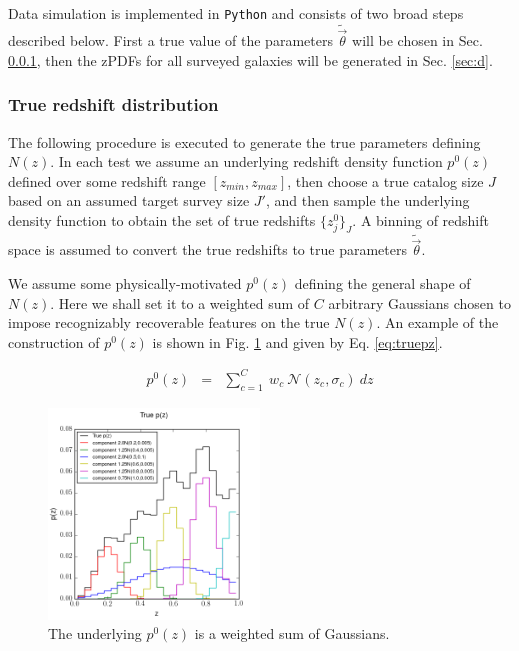 \documentclass[preprint]{aastex}
\begin{document}
Data simulation is implemented in \texttt{Python} and consists of two broad 
steps described below.  First a true value of the parameters 
$\tilde{\vec{\theta}}$ will be chosen in Sec. \ref{sec:theta}, then the zPDFs 
for all surveyed galaxies will be generated in Sec. \ref{sec:d}.  

\clearpage
\subsubsection{True redshift distribution}
\label{sec:theta}

The following procedure is executed to generate the true parameters defining 
$N(z)$.  In each test we assume an underlying redshift density function 
$p^{0}(z)$ defined over some redshift range $[z_{min},z_{max}]$, then choose a 
true catalog size $J$ based on an assumed target survey size $J'$, and then 
sample the underlying density function to obtain the set of true redshifts 
$\{z_{j}^{0}\}_{J}$.  A binning of redshift space is assumed to convert the 
true redshifts to true parameters $\tilde{\vec{\theta}}$.

We assume some physically-motivated $p^{0}(z)$ defining the general shape of 
$N(z)$.  Here we shall set it to a weighted sum of $C$ arbitrary Gaussians 
chosen to impose recognizably recoverable features on the true $N(z)$.  An 
example of the construction of $p^{0}(z)$ is shown in Fig. \ref{fig:physPz} and 
given by Eq. \ref{eq:truepz}.

\begin{eqnarray}
\label{eq:truepz}
p^{0}(z) &=& \sum_{c=1}^{C}\ w_{c}\ \mathcal{N}(z_{c},\sigma_{c})\ dz
\end{eqnarray}

\begin{figure}
\label{fig:physPz}
\includegraphics[width=0.5\textwidth]{physPz.png}
\caption{The underlying $p^{0}(z)$ is a weighted sum of Gaussians.}
\end{figure}
\end{document}
